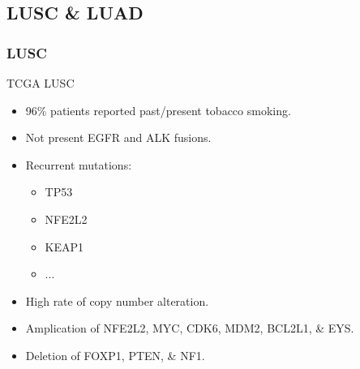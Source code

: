 \documentclass{beamer}
\begin{document}
        \subsection{LUSC \& LUAD}
            \begin{frame}
                \frametitle{LUSC}

                \begin{block}{TCGA LUSC \cite{LUSC-01}}
                    \begin{itemize}
                        \item 96\% patients reported past/present tobacco smoking.
                        \item Not present EGFR and ALK fusions.
                        \item Recurrent mutations:
                        \begin{itemize}
                            \item TP53
                            \item NFE2L2
                            \item KEAP1
                            \item ...
                        \end{itemize}
                        \item High rate of copy number alteration.
                        \item Amplication of NFE2L2, MYC, CDK6, MDM2, BCL2L1, \& EYS.
                        \item Deletion of FOXP1, PTEN, \& NF1.
                    \end{itemize}
                \end{block}
            \end{frame}
\end{document}
